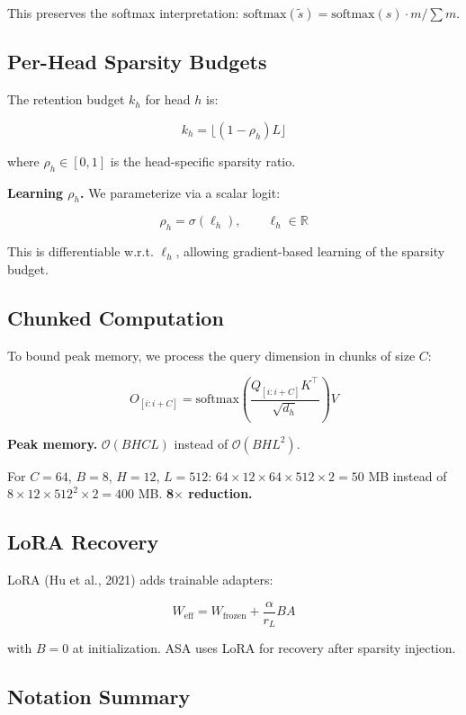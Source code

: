This preserves the softmax interpretation: $\text{softmax}(\tilde{s}) = 
\text{softmax}(s) \cdot m / \sum m$.

\subsection{Per-Head Sparsity Budgets}

The retention budget $k_h$ for head $h$ is:

\[
k_h = \lfloor (1 - \rho_h) L \rfloor
\]

where $\rho_h \in [0, 1]$ is the head-specific sparsity ratio.

\textbf{Learning $\rho_h$.} We parameterize via a scalar logit:

\[
\rho_h = \sigma(\ell_h), \qquad \ell_h \in \mathbb{R}
\]

This is differentiable w.r.t. $\ell_h$, allowing gradient-based learning of 
the sparsity budget.

\subsection{Chunked Computation}

To bound peak memory, we process the query dimension in chunks of size $C$:

\[
O_{[i:i+C]} = \text{softmax}\!\left(\frac{Q_{[i:i+C]} K^\top}{\sqrt{d_h}}\right) V
\]

\textbf{Peak memory.} $\mathcal{O}(B H C L)$ instead of $\mathcal{O}(B H L^2)$.

For $C = 64$, $B = 8$, $H = 12$, $L = 512$: $64 \times 12 \times 64 \times 512 \times 2 = 50$ MB 
instead of $8 \times 12 \times 512^2 \times 2 = 400$ MB. \textbf{8$\times$ reduction.}

\subsection{LoRA Recovery}

LoRA (Hu et al., 2021) adds trainable adapters:

\[
W_\text{eff} = W_\text{frozen} + \frac{\alpha}{r_L} B A
\]

with $B = 0$ at initialization. ASA uses LoRA for recovery after sparsity 
injection.

\subsection{Notation Summary}

